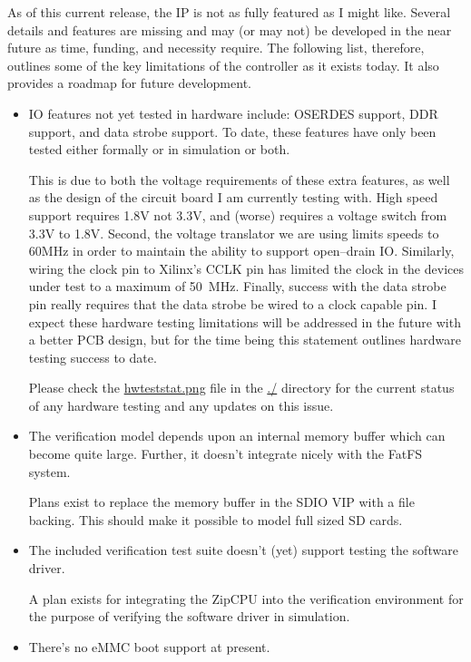 \documentclass{gqtekspec}
\newcommand{\zhref}[2]{\href{#1}{\textcolor{dkblue}{#2}}}
\begin{document}
As of this current release, the IP is not as fully featured as I might
like.  Several details and features are missing and may (or may not)
be developed in the near future as time, funding, and necessity require.
The following list, therefore, outlines some of the key limitations of the
controller as it exists today.  It also provides a roadmap for future
development.

\begin{itemize}
\item IO features not yet tested in hardware include: OSERDES support, DDR
	support, and data strobe support.  To date, these features have only
	been tested either formally or in simulation or both.

	This is due to both the voltage requirements of these extra features,
	as well as the design of the circuit board I am currently testing with.
	High speed support requires 1.8V not 3.3V, and (worse) requires a
	voltage switch from 3.3V to 1.8V.  Second, the voltage translator we
	are using limits speeds to 60MHz in order to maintain the ability to
	support open--drain IO.  Similarly, wiring the clock pin to Xilinx's
	CCLK pin has limited the clock in the devices under test to a maximum
	of 50~MHz.  Finally, success with the data strobe pin really requires
	that the data strobe be wired to a clock capable pin.  I expect these
	hardware testing limitations will be addressed in the future with a
	better PCB design, but for the time being this statement outlines
	hardware testing success to date.

	Please check the \zhref{hwteststat.png}{hwteststat.png} file in
	the \zhref{doc/}{./} directory for the current status of any hardware
	testing and any updates on this issue.

\item The verification model depends upon an internal memory buffer which can
	become quite large.  Further, it doesn't integrate nicely with the
	FatFS system.

	Plans exist to replace the memory buffer in the SDIO VIP with a file
	backing.  This should make it possible to model full sized SD cards.

\item The included verification test suite doesn't (yet) support testing the
	software driver.

	A plan exists for integrating the ZipCPU into the verification
	environment for the purpose of verifying the software driver in
	simulation.

\item There's no eMMC boot support at present.


\end{itemize}
\end{document}
